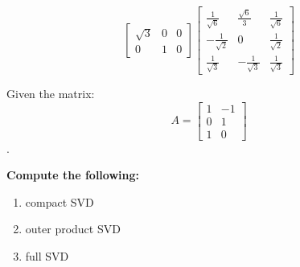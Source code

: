 \begin{enumerate}
{\begin{equation}
      \begin{bmatrix} \sqrt{3} & 0 & 0 \\ 0 & 1 & 0 \end{bmatrix} 
      \begin{bmatrix} \frac{1}{\sqrt{6}} & \frac{\sqrt{6}}{3} & \frac{1}{\sqrt{6}} \\
      -\frac{1}{\sqrt{2}} & 0 & \frac{1}{\sqrt{2}} \\
      \frac{1}{\sqrt{3}} & - \frac{1}{\sqrt{3}} & \frac{1}{\sqrt{3}} \end{bmatrix}
    \end{equation}
  }

  \newpage
  \qitem Given the matrix: 
  $$A = \begin{bmatrix}
    1 & -1 \\
    0 & 1 \\
    1 & 0
  \end{bmatrix}$$. 

  \textbf{Compute the following:}
  \begin{enumerate}
  \item compact SVD
  \item outer product SVD
  \item full SVD
  \end{enumerate}


\end{enumerate}
